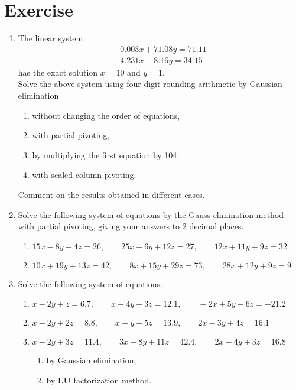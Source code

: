 \documentclass[12pt,class=book,crop=false]{standalone}
\begin{document}
\section{Exercise}
\begin{enumerate}
    \item The linear system
          \begin{align*}
               & 0.003x + 71.08y = 71.11  \\
               & 4.231x -  8.16y  = 34.15
          \end{align*}
          has the exact solution $ x = 10 $ and $ y = 1 $.\\
          Solve the above system using four-digit rounding arithmetic by Gaussian elimination
          \begin{enumerate}
              \item without changing the order of equations,
              \item with partial pivoting,
              \item by multiplying the first equation by 104,
              \item with scaled-column pivoting.
          \end{enumerate}
          Comment on the results obtained in different cases.
    \item Solve the following system of equations by the Gauss elimination method with partial pivoting, giving your answers to 2 decimal places.
          \begin{enumerate}
              \item $ 15x-8y-4z=26,\qquad 25x-6y+12z=27,\qquad 12x+11y+9z=32 $
              \item $ 10x+19y+13z=42,\qquad 8x+15y+29z=73,\qquad 28x+12y+9z=9 $
          \end{enumerate}
    \item Solve the following system of equations.
          \begin{enumerate}
              \item $ x-2y+z=6.7,\qquad x-4y+3z=12.1,\qquad     -2x+5y-6z=-21.2 $
              \item  $x-2y+2z=8.8,\qquad    x-y+5z=13.9,\qquad        2x-3y+4z=16.1$
              \item $x-2y+3z=11.4,\qquad    3x-8y+11z=42.4,\qquad      2x-4y+3z=16.8$
                    \begin{enumerate}
                        \item by Gaussian elimination,
                        \item by $ \mathbf{LU} $ factorization method.

\end{enumerate}
\end{enumerate}
\end{enumerate}
\end{document}
